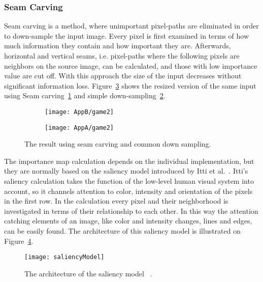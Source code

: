 \documentclass[draft,final]{vutinfth} %
\begin{document}
	\subsubsection{Seam Carving}
	\label{seamCarving}
	Seam carving is a method, where unimportant pixel-paths are eliminated in order to down-sample the input image.
	Every pixel is first examined in terms of how much information they contain and how important they are.
	Afterwards, horizontal and vertical seams, i.e. pixel-paths where the following pixels are neighbors on the source image, can be calculated, and those with low importance value are cut off.
	With this approach the size of the input decreases without significant information loss.  
	Figure~\ref{fig:diff} shows the resized version of the same input using Seam carving~\ref{fig:seamCarv} and simple down-sampling~\ref{fig:downSampl}.\par 
	\begin{figure}[H]
		\centering
		\begin{subfigure}[b]{0.45\columnwidth}
			\centering
			\texttt{[image: AppB/game2]}
			\label{fig:seamCarv}
		\end{subfigure}
		\begin{subfigure}[b]{0.45\columnwidth}
			\centering
			\texttt{[image: AppA/game2]}
			\label{fig:downSampl}
		\end{subfigure}
		\caption{The result using seam carving and common down sampling.}
		\label{fig:diff} %
	\end{figure}
	The importance map calculation depends on the individual implementation, but they are normally based on the saliency model introduced by Itti et al.~\cite{itti1998model}.
	Itti's saliency calculation takes the function of the low-level human visual system into account, so it channels attention to color, intensity and orientation of the pixels in the first row.
	In the calculation every pixel and their neighborhood is investigated in terms of their relationship to each other.
	In this way the attention catching elements of an image, like color and intensity changes, lines and edges, can be easily found. 
	The architecture of this saliency model is illustrated on Figure~\ref{fig:salMod}.\par 
	\begin{figure}[H]
		\centering		
		\texttt{[image: saliencyModel]}
		\caption{The architecture of the saliency model ~\cite{itti1998model}.}
		\label{fig:salMod}
	\end{figure}
\end{document}
